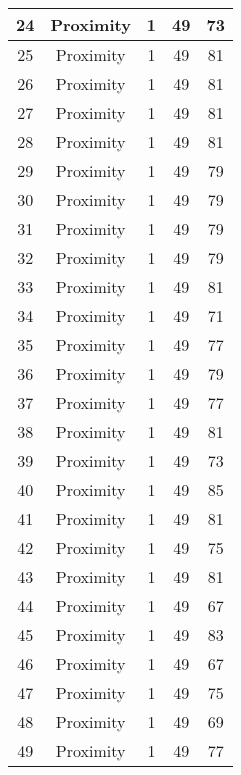 \documentclass[results.tex]{subfiles}
\begin{document}
\begin{center}
\begin{tabular}{| c || c | c | c | c |}
    \hline
    24 & Proximity & 1 & 49 & 73 \\ 
    \hline
    25 & Proximity & 1 & 49 & 81 \\ 
    \hline
    26 & Proximity & 1 & 49 & 81 \\ 
    \hline
    27 & Proximity & 1 & 49 & 81 \\ 
    \hline
    28 & Proximity & 1 & 49 & 81 \\ 
    \hline
    29 & Proximity & 1 & 49 & 79 \\ 
    \hline
    30 & Proximity & 1 & 49 & 79 \\ 
    \hline
    31 & Proximity & 1 & 49 & 79 \\ 
    \hline
    32 & Proximity & 1 & 49 & 79 \\ 
    \hline
    33 & Proximity & 1 & 49 & 81 \\ 
    \hline
    34 & Proximity & 1 & 49 & 71 \\ 
    \hline
    35 & Proximity & 1 & 49 & 77 \\ 
    \hline
    36 & Proximity & 1 & 49 & 79 \\ 
    \hline
    37 & Proximity & 1 & 49 & 77 \\ 
    \hline
    38 & Proximity & 1 & 49 & 81 \\ 
    \hline
    39 & Proximity & 1 & 49 & 73 \\ 
    \hline
    40 & Proximity & 1 & 49 & 85 \\ 
    \hline
    41 & Proximity & 1 & 49 & 81 \\ 
    \hline
    42 & Proximity & 1 & 49 & 75 \\ 
    \hline
    43 & Proximity & 1 & 49 & 81 \\ 
    \hline
    44 & Proximity & 1 & 49 & 67 \\ 
    \hline
    45 & Proximity & 1 & 49 & 83 \\ 
    \hline
    46 & Proximity & 1 & 49 & 67 \\ 
    \hline
    47 & Proximity & 1 & 49 & 75 \\ 
    \hline
    48 & Proximity & 1 & 49 & 69 \\ 
    \hline
    49 & Proximity & 1 & 49 & 77 \\ 
    \hline   \end{tabular}
\end{center}
\end{document}
